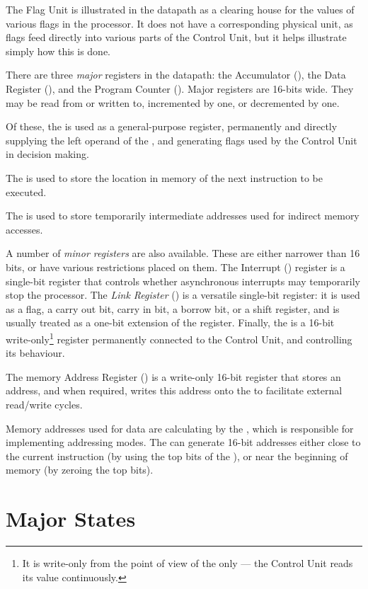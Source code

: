 The Flag Unit is illustrated in the datapath as a clearing house for the values
of various flags in the processor. It does not have a corresponding physical
unit, as flags feed directly into various parts of the Control Unit, but it
helps illustrate simply how this is done.

There are three {\em major\/} registers in the datapath: the \gls{Accumulator} (\A),
the Data Register (\DR), and the Program Counter (\PC). Major registers are
16-bits wide. They may be read from or written to, incremented by one, or
decremented by one.

Of these, the \A{} is used as a general-purpose register, permanently and
directly supplying the left operand of the \ALU, and generating flags
used by the Control Unit in decision making.

The \PC{} is used to store the location in memory of the next instruction to be
executed.

The \DR{} is used to store temporarily intermediate addresses used for indirect
memory accesses.

A number of {\em minor registers} are also available. These are either narrower
than 16 bits, or have various restrictions placed on them. The Interrupt
(\Ireg{}) register is a single-bit register that controls whether asynchronous
interrupts may temporarily stop the processor. The {\em Link Register} (\Lreg)
is a versatile single-bit register: it is used as a flag, a carry out bit,
carry in bit, a borrow bit, or a shift register, and is usually treated as a
one-bit extension of the \A{} register. Finally, the \IR{} is a 16-bit
write-only\footnote{It is write-only from the point of view of the \IBUS{} only
  — the Control Unit reads its value continuously.} register permanently
connected to the Control Unit, and controlling its behaviour.

The memory Address Register (\AR{}) is a write-only 16-bit register that stores
an address, and when required, writes this address onto the \ABUS{} to
facilitate external read/write cycles.

Memory addresses used for data are calculating by the \AGL{}, which is
responsible for implementing addressing modes. The \AGL{} can generate 16-bit
addresses either close to the current instruction (by using the top bits of the
\PC{}), or near the beginning of memory (by zeroing the top bits).

\section{Major States}
\label{sec:major-states}

